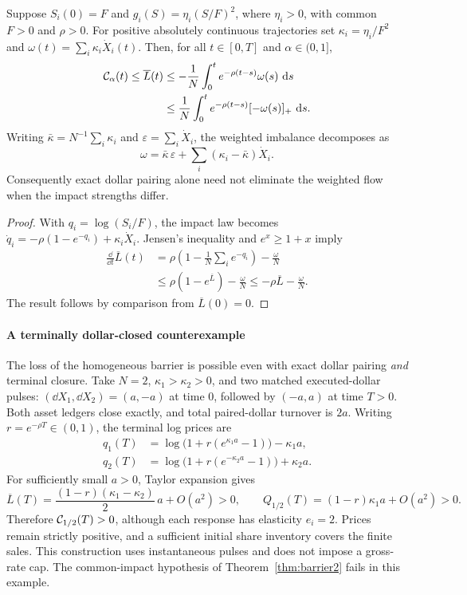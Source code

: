 \documentclass[review,hidelinks,onefignum,onetabnum]{siamonline250211}
\begin{document}
\begin{proposition}
\label{prop:heterogeneous-quadratic}
Suppose $S_i(0)=F$ and
$g_i(S)=\eta_i(S/F)^2$, where $\eta_i>0$, with common
$F>0$ and $\rho>0$. For positive absolutely continuous
trajectories set $\kappa_i=\eta_i/F^2$ and
$\omega(t)=\sum_i\kappa_i\dot X_i(t)$.
Then, for all $t\in[0,T]$ and $\alpha\in(0,1]$,
\[
\begin{aligned}
\mathcal{C}_\alpha(t)\le\overline L(t)
&\le-\frac1N\int_0^t e^{-\rho(t-s)}\omega(s)\,\,\mathrm{d} s\\
&\le\frac1N\int_0^t e^{-\rho(t-s)}[-\omega(s)]_+\,\,\mathrm{d} s.
\end{aligned}
\]
Writing $\bar\kappa=N^{-1}\sum_i\kappa_i$ and
$\varepsilon=\sum_i\dot X_i$, the weighted imbalance decomposes as
\[
\omega=\bar\kappa\,\varepsilon+
\sum_i(\kappa_i-\bar\kappa)\dot X_i.
\]
Consequently exact dollar pairing alone need not eliminate the
weighted flow when the impact strengths differ.
\end{proposition}
\begin{proof}
With $q_i=\log(S_i/F)$, the impact law becomes
$\dot q_i=-\rho(1-e^{-q_i})+\kappa_i\dot X_i$.
Jensen's inequality and $e^x\ge1+x$ imply
\[
\begin{aligned}
\frac{\dd}{\dd t}\overline L(t)
&=\rho\left(1-\frac1N\sum_i e^{-q_i}\right)
-\frac{\omega}{N}\\
&\le\rho(1-e^{\overline L})-\frac{\omega}{N}
\le-\rho\overline L-\frac{\omega}{N}.
\end{aligned}
\]
The result follows by comparison from $\overline L(0)=0$.
\end{proof}

\paragraph{A terminally dollar-closed counterexample}
The loss of the homogeneous barrier is possible even with
exact dollar pairing \emph{and} terminal closure. Take $N=2$,
$\kappa_1>\kappa_2>0$, and two matched executed-dollar pulses:
$(\dd X_1,\dd X_2)=(a,-a)$ at time $0$, followed by
$(-a,a)$ at time $T>0$. Both asset ledgers close exactly,
and total paired-dollar turnover is $2a$.
Writing $r=e^{-\rho T}\in(0,1)$, the terminal log prices are
\[
\begin{aligned}
q_1(T)&=\log\bigl(1+r(e^{\kappa_1a}-1)\bigr)-\kappa_1a,\\
q_2(T)&=\log\bigl(1+r(e^{-\kappa_2a}-1)\bigr)+\kappa_2a.
\end{aligned}
\]
For sufficiently small $a>0$, Taylor expansion gives
\[
\overline L(T)=
\frac{(1-r)(\kappa_1-\kappa_2)}2\,a+O(a^2)>0,
\qquad
Q_{1/2}(T)=(1-r)\kappa_1a+O(a^2)>0.
\]
Therefore $\mathcal{C}_{1/2}(T)>0$, although each response has
elasticity $e_i=2$. Prices remain strictly positive, and a
sufficient initial share inventory covers the finite sales.
This construction uses instantaneous pulses and does not impose a
gross-rate cap. The common-impact hypothesis of Theorem~\ref{thm:barrier2}
fails in this example.
\end{document}
